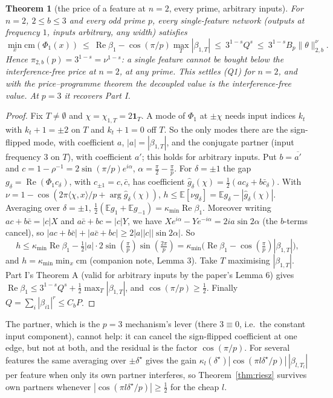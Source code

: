 \documentclass[11pt]{article}
\newtheorem{theorem}{Theorem}
\theoremstyle{definition}
\renewcommand{\Re}{\operatorname{Re}}
\begin{document}
\begin{theorem}[the price of a feature at $n=2$, every prime, arbitrary inputs]\label{thm:q1n2}
For $n=2$, $2\le b\le3$ and every odd prime $p$, every single-feature network (outputs at frequency $1$, inputs
arbitrary, any width) satisfies
\[\min_x\mathrm{cm}(\Phi_1(x))\ \le\ \Re\beta_1-\cos(\pi/p)\max_T|\beta_{1,T}|\ \le\ 3^{1-s}Q^s\ \le\ 3^{1-s}B_p\|\theta\|_{2,b}^{\nu}.\]
Hence $\pi_{2,b}(p)=3^{1-s}=\nu^{1-s}$: a single feature cannot be bought below the interference-free price at $n=2$, at any
prime.  This settles (Q1) for $n=2$, and with the price--programme theorem the decoupled value is the interference-free
value.  At $p=3$ it recovers Part I.
\end{theorem}
\begin{proof}
Fix $T\ne\emptyset$ and $\chi=\chi_{1,T}=2\mathbf 1_T$.  A mode of $\Phi_1$ at $\pm\chi$ needs input indices $k_t$ with $k_t+1=\pm2$ on $T$ and
$k_t+1=0$ off $T$.  So the only modes there are the sign-flipped mode, with coefficient $a$, $|a|=|\beta_{1,T}|$, and the
conjugate partner (input frequency $3$ on $T$), with coefficient $a'$; this holds for arbitrary inputs.  Put $b=\overline{a'}$ and
$c=1-\rho^{-1}=2\sin(\pi/p)e^{i\alpha}$, $\alpha=\frac\pi2-\frac\pi p$.  For $\delta=\pm1$ the gap $g_\delta=\Re(\Phi_1c_\delta)$, with $c_{\pm1}=c,\bar c$, has
coefficient $\hat g_\delta(\chi)=\frac12(ac_\delta+b\bar c_\delta)$.  With $\nu=1-\cos(2\pi\langle\chi,x\rangle/p+\arg\hat g_\delta(\chi))$, $h\le\mathbb E[\nu g_\delta]=\mathbb E g_\delta-|\hat g_\delta(\chi)|$.
Averaging over $\delta=\pm1$, $\frac12(\mathbb Eg_1+\mathbb Eg_{-1})=\kappa_{\min}\Re\beta_1$.  Moreover
writing $ac+b\bar c=|c|X$ and $a\bar c+bc=|c|Y$, we have $Xe^{i\alpha}-Ye^{-i\alpha}=2ia\sin2\alpha$ (the $b$-terms cancel), so $|ac+b\bar c|+|a\bar c+bc|\ge2|a||c||\sin2\alpha|$.  So
\[h\le\kappa_{\min}\Re\beta_1-\tfrac12|a|\cdot2\sin(\tfrac\pi p)\sin(\tfrac{2\pi}p)=\kappa_{\min}\big(\Re\beta_1-\cos(\tfrac\pi p)|\beta_{1,T}|\big),\]
and $h=\kappa_{\min}\min_x\mathrm{cm}$ (companion note, Lemma 3).  Take $T$ maximising $|\beta_{1,T}|$.  Part I's Theorem A (valid for
arbitrary inputs by the paper's Lemma 6) gives $\Re\beta_1\le3^{1-s}Q^s+\frac12\max_T|\beta_{1,T}|$, and $\cos(\pi/p)\ge\frac12$.
Finally $Q=\sum_i|\beta_{i1}|^r\le C_bP$.
\end{proof}
The partner, which is the $p=3$ mechanism's lever (there $3\equiv0$, i.e.\ the constant input component), cannot help: it can
cancel the sign-flipped coefficient at one edge, but not at both, and the residual is the factor $\cos(\pi/p)$.  For
several features the same averaging over $\pm\delta^\star$ gives the gain $\kappa_l(\delta^\star)|\cos(\pi l\delta^\star/p)|\,|\beta_{l,T_l}|$ per
feature when only its own partner interferes, so Theorem~\ref{thm:riesz} survives own partners whenever
$|\cos(\pi l\delta^\star/p)|\ge\frac12$ for the cheap $l$.
\end{document}
